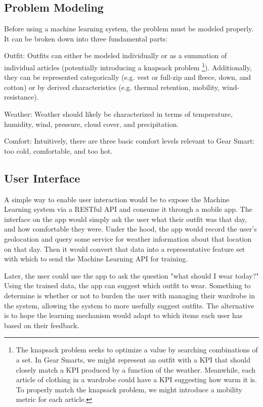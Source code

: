 \subsection{Problem Modeling}
Before using a machine learning system, the problem must be modeled properly. It can be broken down into three fundamental parts:

\begin{description}
  \item{Outfit:} Outfits can either be modeled individually or as a summation of individual articles (potentially introducing
  a knapsack problem \footnote{The knapsack problem seeks to optimize a value by searching combinations of a set. In Gear Smarts,
  we might represent an outfit with a KPI that should closely match a KPI produced by a function of the weather. Meanwhile, each
  article of clothing in a wardrobe could have a KPI suggesting how warm it is. To properly match the knapsack problem, we might
  introduce a mobility metric for each article.}). Additionally, they can be represented categorically (e.g. vest or full-zip and
  fleece, down, and cotton) or by derived characteristics (e.g. thermal retention, mobility, wind-resistance).
  \item{Weather:} Weather should likely be characterized in terms of temperature, humidity, wind, pressure,
  cloud cover, and precipitation.
  \item{Comfort:} Intuitively, there are three basic comfort levels relevant to Gear Smart: too cold, comfortable, and too hot.
\end{description}

\subsection{User Interface}
A simple way to enable user interaction would be to expose the Machine Learning system via a RESTful API and consume it
through a mobile app. The interface on the app would simply ask the user what their outfit was that day, and how comfortable
they were. Under the hood, the app would record the user's geolocation and query some service for weather information
about that location on that day. Then it would convert that data into a representative feature set with which to send
the Machine Learning API for training.

Later, the user could use the app to ask the question "what should I wear today?" Using the trained data, the app can
suggest which outfit to wear. Something to determine is whether or not to burden the user with managing
their wardrobe in the system, allowing the system to more usefully suggest outfits. The alternative is to hope the
learning mechanism would adapt to which items each user has based on their feedback.
